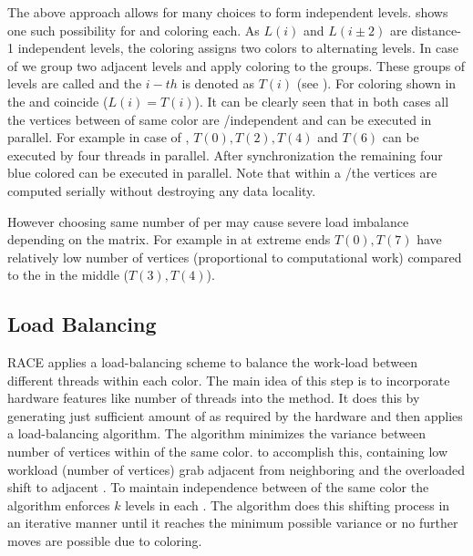   \setlength{\belowcaptionskip}{0pt}
The above approach allows for many choices to form \DK independent levels.  shows 
one such possibility for \DONE and \DTWO coloring each. As $L(i)$ and $L(i\pm2)$ are
distance-1 independent levels, the \DONE coloring  assigns
two colors to alternating levels.  In case of \DTWO we group two adjacent levels and apply \DONE
coloring to the groups. These groups of levels are called \levelGroups
 and the $i-th$ \levelGroup is denoted as $T(i)$ (see ).
For \DONE coloring shown in  the \levels and \levelGroups
coincide ($L(i) = T(i)$).
It can be clearly seen that in both cases
 all the vertices  between \levelGroups of same color
  are \DONE/\DTWO independent  and can be executed in parallel.
   For example in case of \DTWO, \levelGroups $T(0), T(2), T(4)$
 and $T(6)$ can be executed by four threads in parallel. After synchronization the remaining 
 four blue colored \levelGroups can be executed in parallel. Note that
 within a \levelGroup/\level the vertices are computed serially without destroying
 any data locality.

However choosing same number of \levels per \levelGroup may cause severe
load imbalance depending on the matrix. For example in  
 \levelGroups at extreme ends $T(0), T(7)$  have relatively low number of 
 vertices (proportional to computational work)  compared to the \levelGroups 
 in the middle ($T(3),T(4)$).


\subsection{Load Balancing}
\Acrshort{RACE} applies a load-balancing scheme to balance the work-load
between different threads within each color. The main idea of this step
is to incorporate hardware features like number of threads into the 
method. It does this by generating just sufficient amount of \levelGroups 
as required by the hardware and then applies a load-balancing algorithm.
The algorithm minimizes the variance between number of vertices 
within \levelGroups of the same color. \Inorder to
 accomplish this, \levelGroups containing low workload (number of vertices)
 grab adjacent \levels from neighboring \levelGroups and the overloaded
 \levelGroups shift \levels to adjacent \levelGroups. To maintain
 \DK independence between \levelGroups of the same color the algorithm enforces \atleast $k$ levels in each \levelGroup. The algorithm 
 does this shifting process in an iterative manner until it reaches the
 minimum possible variance or no further moves are possible due to
 \DK coloring.
 
